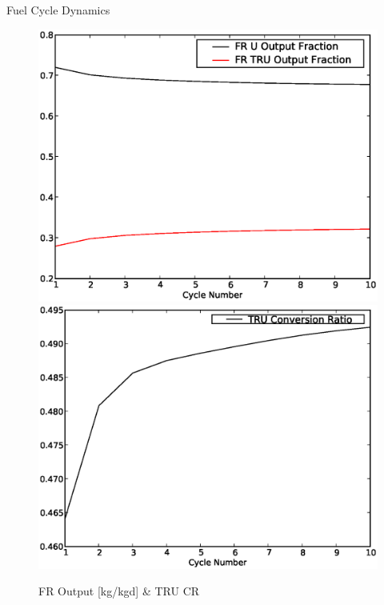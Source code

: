 \documentclass[pdf, autumn, slideColor, nocolorBG]{prosper}
\begin{document}
\begin{slide}{Fuel Cycle Dynamics}
\vspace{0.75cm}
\begin{center}
\begin{figure}
\caption{FR Output [kg/kgd] \& TRU CR}
\includegraphics[scale=0.275]{../se_sensitivity/figs/FRfracOut.eps} 
\includegraphics[scale=0.275]{../se_sensitivity/figs/TruCR.eps}
\end{figure}
\end{center}
\end{slide}
\end{document}
